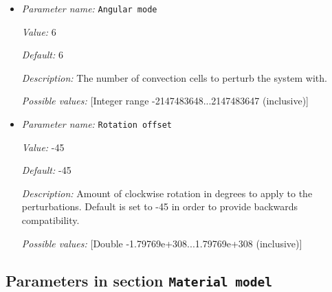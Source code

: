 \begin{itemize}
\item {\it Parameter name:} {\tt Angular mode}
\label{parameters:Initial conditions/Spherical hexagonal perturbation/Angular mode}


{\it Value:} 6


{\it Default:} 6


{\it Description:} The number of convection cells to perturb the system with.


{\it Possible values:} [Integer range -2147483648...2147483647 (inclusive)]
\item {\it Parameter name:} {\tt Rotation offset}
\label{parameters:Initial conditions/Spherical hexagonal perturbation/Rotation offset}


{\it Value:} -45


{\it Default:} -45


{\it Description:} Amount of clockwise rotation in degrees to apply to the perturbations. Default is set to -45 in order to provide backwards compatibility.


{\it Possible values:} [Double -1.79769e+308...1.79769e+308 (inclusive)]
\end{itemize}

\subsection{Parameters in section \tt Material model}
\label{parameters:Material_20model}


